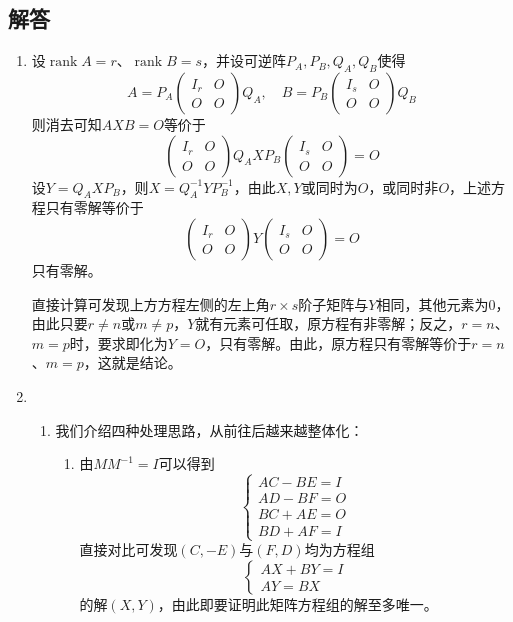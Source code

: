 \documentclass[a4paper,UTF8,fontset=windows]{ctexart}
\DeclareMathOperator{\rank}{rank}
\begin{document}
\subsection{解答}
\begin{enumerate}
    \item 设$\rank A=r$、$\rank B=s$，并设可逆阵$P_A,P_B,Q_A,Q_B$使得
    $$A=P_A\begin{pmatrix}I_r&O\\O&O\end{pmatrix}Q_A,\quad B=P_B\begin{pmatrix}I_s&O\\O&O\end{pmatrix}Q_B$$
    则消去可知$AXB=O$等价于
    $$\begin{pmatrix}I_r&O\\O&O\end{pmatrix}Q_AXP_B\begin{pmatrix}I_s&O\\O&O\end{pmatrix}=O$$
    设$Y=Q_AXP_B$，则$X=Q_A^{-1}YP_B^{-1}$，由此$X,Y$或同时为$O$，或同时非$O$，上述方程只有零解等价于
    $$\begin{pmatrix}I_r&O\\O&O\end{pmatrix}Y\begin{pmatrix}I_s&O\\O&O\end{pmatrix}=O$$
    只有零解。

    直接计算可发现上方方程左侧的左上角$r\times s$阶子矩阵与$Y$相同，其他元素为0，由此只要$r\ne n$或$m\ne p$，$Y$就有元素可任取，原方程有非零解；反之，$r=n$、$m=p$时，要求即化为$Y=O$，只有零解。由此，原方程只有零解等价于$r=n$、$m=p$，这就是结论。

    \item
    \begin{enumerate}
        \item 我们介绍四种处理思路，从前往后越来越整体化：
        \begin{enumerate}
            \item 由$MM^{-1}=I$可以得到
            $$\begin{cases}AC-BE=I\\AD-BF=O\\BC+AE=O\\BD+AF=I\end{cases}$$
            直接对比可发现$(C,-E)$与$(F,D)$均为方程组
            $$\begin{cases}AX+BY=I\\AY=BX\end{cases}$$
            的解$(X,Y)$，由此即要证明此矩阵方程组的解至多唯一。


\end{enumerate}
\end{enumerate}
\end{enumerate}
\end{document}
